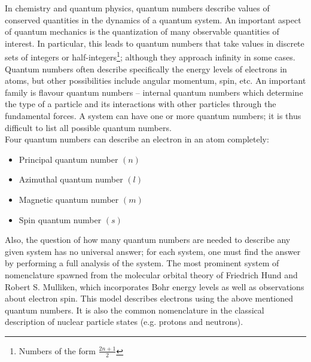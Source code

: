 \begin{chembox}{}
{In chemistry and quantum physics, quantum numbers describe values of conserved quantities in the dynamics of a quantum system. 
An important aspect of quantum mechanics is the quantization of many observable quantities of interest. In particular, this leads to quantum numbers that take values in discrete sets of integers or half-integers\footnote{Numbers of the form $\frac{2n+1}{2}$}; although they approach infinity in some cases. Quantum numbers often describe specifically the energy levels of electrons in atoms, but other possibilities include angular momentum, spin, etc. An important family is flavour quantum numbers – internal quantum numbers which determine the type of a particle and its interactions with other particles through the fundamental forces. A system can have one or more quantum numbers; it is thus difficult to list all possible quantum numbers.\\
Four quantum numbers can describe an electron in an atom completely:
\begin{itemize}
    \item{Principal quantum number $(n)$}
    \item{Azimuthal quantum number $(l)$}
    \item{Magnetic quantum number $(m)$}
    \item{Spin quantum number $(s)$}
\end{itemize}
Also, the question of how many quantum numbers are needed to describe any given system has no universal answer; for each system, one must find the answer by performing a full analysis of the system. The most prominent system of nomenclature spawned from the molecular orbital theory of Friedrich Hund and Robert S. Mulliken, which incorporates Bohr energy levels as well as observations about electron spin. This model describes electrons using the above mentioned quantum numbers. It is also the common nomenclature in the classical description of nuclear particle states (e.g. protons and neutrons).}
\end{chembox}

